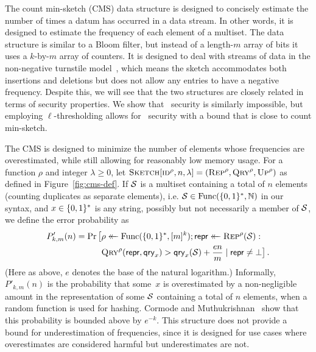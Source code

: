 The count min-sketch (CMS) data structure is designed to concisely estimate the
number of times a datum has occurred in a data stream. In other words, it is
designed to estimate the frequency of each element of a multiset. The data
structure is similar to a Bloom filter, but instead of a length-$m$ array of
bits it uses a $k$-by-$m$ array of counters. It is designed to deal with streams
of data in the non-negative turnstile model~\cite{cormode2005improved}, which
means the sketch accommodates both insertions and deletions but does not allow
any entries to have a negative frequency.
Despite this, we will see that the two structures are closely related in
terms of security properties. We show that \errep\ security is similarly
impossible, but employing $\ell$-thresholding allows for \erreps\ security with a
bound that is close to count min-sketch.

%
The CMS is designed to minimize the number of elements whose
frequencies are overestimated, while still allowing for reasonably low memory
usage. For a function $\rho$ and integer $\lambda\ge0$, let
$\textnormal{\textsc{Sketch}}[\textnormal{\textsc{id}}^\rho,n,\lambda] = (\textnormal{\textsc{Rep}}^\rho,\textnormal{\textsc{Qry}}^\rho,\textnormal{\textsc{Up}}^\rho)$ as defined in
Figure~\ref{fig:cms-def}. If $\mathcal{S}$ is a multiset containing a total of $n$ elements
(counting duplicates as separate elements), i.e. $\mathcal{S} \in \mathrm{Func}(\{0,1\}^*,\mathbb{N})$ in
our syntax, and $x \in \{0,1\}^*$ is any string, possibly but not necessarily a
member of $\mathcal{S}$, we define the error probability as
\begin{equation}\label{eq:bf-fp}
  \begin{aligned}
    P'_{k,m}(n) =
      \Pr\big[&\rho \mathrel{\leftarrow\mkern-14mu\leftarrow} \mathrm{Func}(\{0,1\}^*,[m]^k);
              \mathsf{repr} \mathrel{\leftarrow\mkern-14mu\leftarrow} \textnormal{\textsc{Rep}}^\rho(\mathcal{S}): \\
              &\textnormal{\textsc{Qry}}^\rho(\mathsf{repr}, \mathsf{qry}_x) > \mathsf{qry}_x(\mathcal{S})+\frac{en}{m} \mid \mathsf{repr} \ne \bot
      \big] \,.
  \end{aligned}
\end{equation}
%
(Here as above, $e$ denotes the base of the natural logarithm.)
%
Informally, $P'_{k,m}(n)$ is the probability that some~$x$ is overestimated by a
non-negligible amount in the representation of some $\mathcal{S}$ containing a total
of $n$ elements, when a random function is used for hashing. Cormode and
Muthukrishnan~\cite{cormode2005improved} show that this probability is bounded
above by $e^{-k}$. This structure does not provide a bound for underestimation
of frequencies, since it is designed for use cases where overestimates are
considered harmful but underestimates are not.

